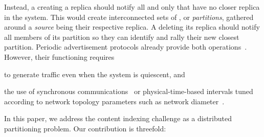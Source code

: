 Instead, a \process creating a replica should notify all and only
\processes that have no closer replica in the system. This would
create interconnected sets of \processes, or \emph{partitions},
gathered around a \emph{source} being their respective replica. A
\process deleting its replica should notify all members of its
partition so they can identify and rally their new closest
partition. Periodic advertisement protocols already provide both
operations~\cite{hemmati2015namebased, sohier2012physarum}. However,
their functioning requires
\begin{inparaenum}[(i)]
\item to generate traffic even when the system is quiescent, and
\item the use of synchronous communications~\cite{sohier2012physarum}
  or physical-time-based intervals tuned according to network topology
  parameters such as network diameter~\cite{hemmati2015namebased}.
\end{inparaenum}


\noindent In this paper, we address the content indexing challenge as
a distributed partitioning problem. Our contribution is threefold:

